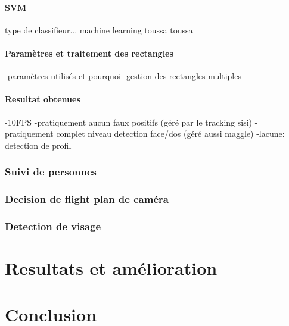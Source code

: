 \documentclass[11pt]{article}
\begin{document}
\subsection{SVM}
type de classifieur... machine learning toussa toussa

\subsection{Paramètres et traitement des rectangles}
-paramètres utilisés et pourquoi
-gestion des rectangles multiples

\subsection{Resultat obtenues}
-10FPS
-pratiquement aucun faux positifs
(géré par le tracking sisi)
-pratiquement complet niveau detection face/dos
(géré aussi maggle)
-lacune: detection de profil

\section{Suivi de personnes}
\section{Decision de flight plan de caméra}
\section{Detection de visage}
\pagebreak
\part*{Resultats et amélioration}
\pagebreak
\part*{Conclusion}
\pagebreak
\end{document}
